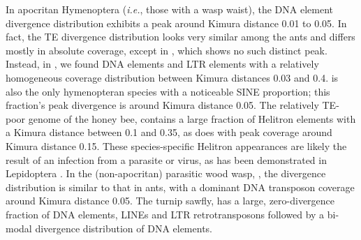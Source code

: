 In apocritan Hymenoptera (\emph{i.e.}, those with a wasp waist), the DNA
element divergence distribution exhibits a peak around Kimura distance
0.01 to 0.05. In fact, the TE divergence distribution looks very similar
among the ants and differs mostly in absolute coverage, except in
, which shows no such distinct peak.
Instead, in , we found DNA elements and LTR
elements with a relatively homogeneous coverage distribution between
Kimura distances 0.03 and 0.4.  is also the only
hymenopteran species with a noticeable SINE proportion; this fraction's
peak divergence is around Kimura distance 0.05. The relatively TE-poor
genome of the honey bee,  contains a large
fraction of Helitron elements with a Kimura distance between 0.1 and
0.35, as does  with peak coverage around
Kimura distance 0.15. These species-specific Helitron appearances are
likely the result of an infection from a parasite or virus, as has been
demonstrated in Lepidoptera \citep{Coates2015}. In the (non-apocritan)
parasitic wood wasp, , the divergence distribution
is similar to that in ants, with a dominant DNA transposon coverage
around Kimura distance 0.05. The turnip sawfly,  has a
large, zero-divergence fraction of DNA elements, LINEs and LTR
retrotransposons followed by a bi-modal divergence distribution of DNA
elements.

